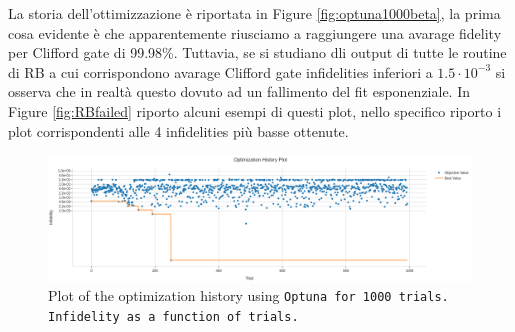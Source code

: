 La storia dell'ottimizzazione è riportata in Figure \ref{fig:optuna1000beta}, la prima cosa evidente è che apparentemente riusciamo a raggiungere una avarage fidelity per Clifford gate di 99.98\%.
Tuttavia, se si studiano dli output di tutte le routine di RB a cui corrispondono avarage Clifford gate infidelities inferiori a $1.5\cdot10^{-3}$ si osserva che in realtà questo dovuto ad un fallimento del fit esponenziale.
In Figure \ref{fig:RBfailed} riporto alcuni esempi di questi plot, nello specifico riporto i plot corrispondenti alle 4 infidelities più basse ottenute.

\begin{figure}[h!]
    \centering
    \includegraphics[width=\textwidth]{figures/png/RB_optimization/Optuna/1000beta/optimization.png}
    \caption{Plot of the optimization history using \tt{Optuna} for 1000 trials. Infidelity as a function of trials.}
    \label{fig:optuna1000beta:optimization}
\end{figure}

